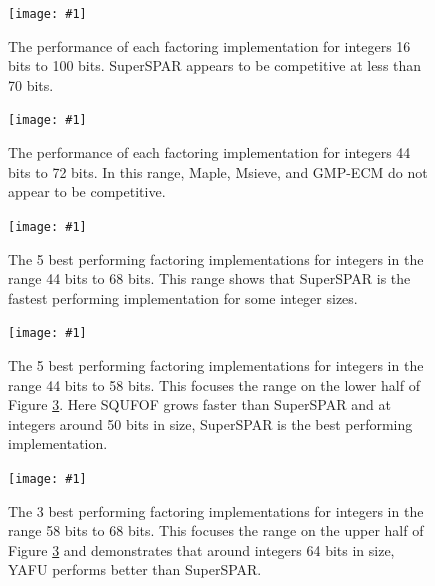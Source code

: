 \documentclass{ucalgthes1}
\theoremstyle{definition}
\newcommand{\mygraphX}[4]{
	\begin{figure}[htb]
	\centering
	\texttt{[image: \#1]}
	\caption[#4]{#3}
	\label{#2}
	\end{figure}
}
\begin{document}
\mygraphX{factoring-all.eps}{fig:factoring1}{The performance of each factoring implementation for integers 16 bits to 100 bits.  SuperSPAR appears to be competitive at less than 70 bits.}{Factoring performance for 16 bits to 100 bits.}
\mygraphX{factoring-all-44-72.eps}{fig:factoring2}{The performance of each factoring implementation for integers 44 bits to 72 bits.  In this range, Maple, Msieve, and GMP-ECM do not appear to be competitive.}{Factoring performance for 44 bits to 72 bits.}
\mygraphX{factoring-small-44-68.eps}{fig:factoring3}{The 5 best performing factoring implementations for integers in the range 44 bits to 68 bits.  This range shows that SuperSPAR is the fastest performing implementation for some integer sizes.}{Best factoring implementations for 44 bits to 68 bits.}
\mygraphX{factoring-small-44-58.eps}{fig:factoring4}{The 5 best performing factoring implementations for integers in the range 44 bits to 58 bits.  This focuses the range on the lower half of Figure \ref{fig:factoring3}.  Here SQUFOF grows faster than SuperSPAR and at integers around 50 bits in size, SuperSPAR is the best performing implementation.}{Best factoring implementations for 44 bits to 58 bits.}
\mygraphX{factoring-small-58-68.eps}{fig:factoring5}{The 3 best performing factoring implementations for integers in the range 58 bits to 68 bits.  This focuses the range on the upper half of Figure \ref{fig:factoring3} and demonstrates that around integers 64 bits in size, YAFU performs better than SuperSPAR.}{Best factoring implementations for 58 bits to 68 bits.}
\end{document}
